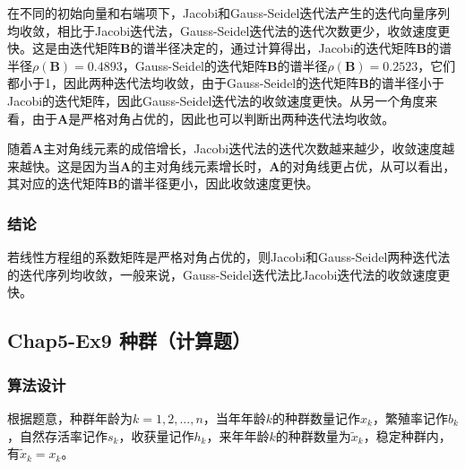 \documentclass[12pt,a4paper]{article}
\begin{document}
在不同的初始向量和右端项下，Jacobi和Gauss-Seidel迭代法产生的迭代向量序列均收敛，相比于Jacobi迭代法，Gauss-Seidel迭代法的迭代次数更少，收敛速度更快。这是由迭代矩阵$\boldsymbol{B}$的谱半径决定的，通过计算得出，Jacobi的迭代矩阵$\boldsymbol{B}$的谱半径$\rho(\boldsymbol{B}) = 0.4893$，Gauss-Seidel的迭代矩阵$\boldsymbol{B}$的谱半径$\rho(\boldsymbol{B}) = 0.2523$，它们都小于1，因此两种迭代法均收敛，由于Gauss-Seidel的迭代矩阵$\boldsymbol{B}$的谱半径小于Jacobi的迭代矩阵，因此Gauss-Seidel迭代法的收敛速度更快。从另一个角度来看，由于$\boldsymbol{A}$是严格对角占优的，因此也可以判断出两种迭代法均收敛。

随着$\boldsymbol{A}$主对角线元素的成倍增长，Jacobi迭代法的迭代次数越来越少，收敛速度越来越快。这是因为当$\boldsymbol{A}$的主对角线元素增长时，$\boldsymbol{A}$的对角线更占优，从可以看出，其对应的迭代矩阵$\boldsymbol{B}$的谱半径更小，因此收敛速度更快。

\subsubsection{结论}

若线性方程组的系数矩阵是严格对角占优的，则Jacobi和Gauss-Seidel两种迭代法的迭代序列均收敛，一般来说，Gauss-Seidel迭代法比Jacobi迭代法的收敛速度更快。

\subsection{Chap5-Ex9 种群（计算题）}

\subsubsection{算法设计}

根据题意，种群年龄为$k=1,2,...,n$，当年年龄$k$的种群数量记作$x_k$，繁殖率记作$b_k$，自然存活率记作$s_k$，收获量记作$h_k$，来年年龄$k$的种群数量为$\tilde{x}_k$，稳定种群内，有$\tilde{x}_k=x_k$。
\end{document}
